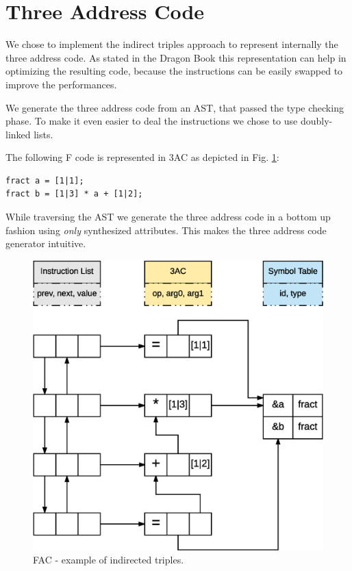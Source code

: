 \section{Three Address Code}
We chose to implement the indirect triples approach to represent internally
the three address code. As stated in the Dragon Book \cite{dragonbook} this 
representation
can help in optimizing the resulting code, because the instructions can be
easily swapped to improve the performances.

We generate the three address code from an AST, that passed the type checking
phase. To make it even easier to deal the instructions we chose to use
doubly-linked lists.

The following F code is represented in 3AC as depicted in Fig. 
\ref{fig:ind-trpl}:
\begin{verbatim}
fract a = [1|1];
fract b = [1|3] * a + [1|2];
\end{verbatim}

While traversing the AST we generate the three address code in a bottom up
fashion using \emph{only} synthesized attributes. This makes the three address
code generator intuitive.

\begin{figure}[H]
  \centering
  \includegraphics[width=.9\columnwidth]{img/eps/indirect_triples.eps}
  \caption{FAC - example of indirected triples.}
  \label{fig:ind-trpl}
\end{figure}
